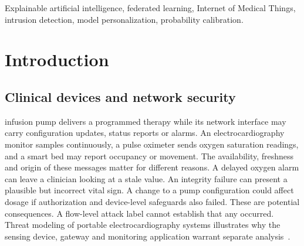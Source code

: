 \documentclass[nolineno]{ieeeaccess}
\begin{document}
\begin{abstract}
Client-averaged scores can conceal frequent false alarms on a particular communication protocol. We study this discrepancy in federated intrusion detection for the Internet of Medical Things using Wi-Fi, Message Queuing Telemetry Transport, and Bluetooth traffic. We keep identical feature vectors together when assigning training, validation, and test partitions and compare methods across \RevisionSeeds{} matched seeds. Federated averaging attained a client-mean macro F1 of \RevisionAvgF{} and Bluetooth benign recall of \RevisionAvgB{}. A private classification head raised Bluetooth benign recall to \RevisionPerB{}, and fixed protocol grouping raised it to \RevisionFixedB{}. The adaptive procedure selected separate groups for all clients. An equal-weight aggregation control also improved specificity. On frozen federated averaging models, a validation-fitted slope and intercept improved probability scores and specificity at a cost in attack recall. Positive temperature scaling improved probability scores while preserving the decisions. The mean absolute Shapley additive explanation rankings of two models remained highly correlated on the same Bluetooth records despite different operating points. These results describe one derived dataset and a fixed training schedule. Capture and device identities were unavailable, so evaluation on independent medical traffic remains open.
\end{abstract}
\begin{keywords}
Explainable artificial intelligence, federated learning, Internet of Medical Things, intrusion detection, model personalization, probability calibration.
\end{keywords}
\titlepgskip=-15pt
\maketitle
\section{Introduction}\label{sec:introduction}
\subsection{Clinical devices and network security}
 infusion pump delivers a programmed therapy while its network interface may carry configuration updates, status reports or alarms. An electrocardiography monitor samples continuously, a pulse oximeter sends oxygen saturation readings, and a smart bed may report occupancy or movement. The availability, freshness and origin of these messages matter for different reasons. A delayed oxygen alarm can leave a clinician looking at a stale value. An integrity failure can present a plausible but incorrect vital sign. A change to a pump configuration could affect dosage if authorization and device-level safeguards also failed. These are potential consequences. A flow-level attack label cannot establish that any occurred. Threat modeling of portable electrocardiography systems illustrates why the sensing device, gateway and monitoring application warrant separate analysis~\cite{ecg,trustreview,clinicalrisk}.
\end{document}
